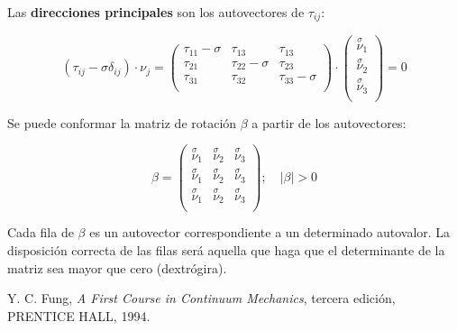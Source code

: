 \documentclass[a4paper,12pt,twoside,final,spanish]{article}
\begin{document}
Las \textbf{direcciones principales} son los autovectores de $\tau_{ij}$:

\[
(\tau_{ij}-\sigma\delta_{ij})\cdot\nu_{j}=
\left(\begin{matrix}
\tau_{11}-\sigma & \tau_{13} & \tau_{13} \\
\tau_{21} & \tau_{22}-\sigma & \tau_{23} \\
\tau_{31} & \tau_{32} & \tau_{33}-\sigma \\
\end{matrix}\right)\cdot
\left(\begin{matrix}
\stackrel \sigma \nu_{1} \\
\stackrel \sigma \nu_{2} \\
\stackrel \sigma \nu_{3} \\
\end{matrix}\right)=0
\]

Se puede conformar la matriz de rotación $\beta$ a partir de los autovectores:

\[
\beta=
\left(\begin{matrix}
\stackrel \sigma \nu_{1} & \stackrel \sigma \nu_{2} & \stackrel \sigma \nu_{3} \\
\stackrel \sigma \nu_{1} & \stackrel \sigma \nu_{2} & \stackrel \sigma \nu_{3} \\
\stackrel \sigma \nu_{1} & \stackrel \sigma \nu_{2} & \stackrel \sigma \nu_{3} \\
\end{matrix}\right);\quad
|\beta|>0
\]

Cada fila de $\beta$ es un autovector correspondiente a un determinado autovalor. La disposición correcta de las filas será aquella que haga que el determinante de la matriz sea mayor que cero (dextrógira).

\begin{thebibliography}{1}
Y. C. Fung,
\emph{A First Course in Continuum Mechanics}, 
tercera edición,
PRENTICE HALL,
1994.
\end{thebibliography}
\end{document}
